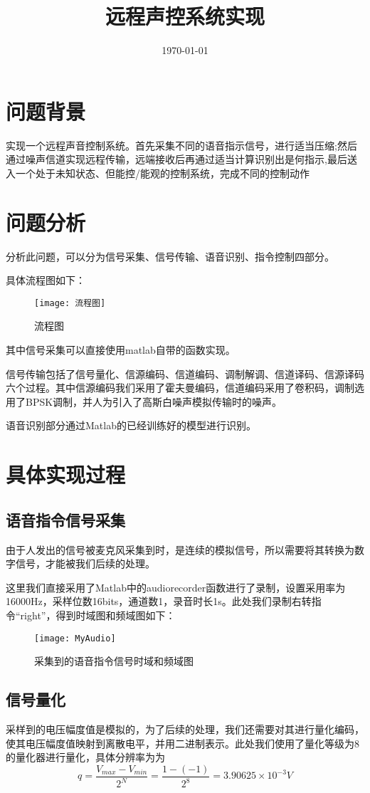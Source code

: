\documentclass{../source/Experiment}
\title{远程声控系统实现}
\date{\today}
\begin{document}
\makecover

\section{问题背景}
实现一个远程声音控制系统。首先采集不同的语音指示信号，进行适当压缩;然后通过噪声信道实现远程传输，远端接收后再通过适当计算识别出是何指示,最后送入一个处于未知状态、但能控/能观的控制系统，完成不同的控制动作

\section{问题分析}
分析此问题，可以分为信号采集、信号传输、语音识别、指令控制四部分。

具体流程图如下：
\begin{figure}[H]
    \centering
    \texttt{[image: 流程图]}
    \caption{流程图}
\end{figure}
其中信号采集可以直接使用matlab自带的函数实现。

信号传输包括了信号量化、信源编码、信道编码、调制解调、信道译码、信源译码六个过程。其中信源编码我们采用了霍夫曼编码，信道编码采用了卷积码，调制选用了BPSK调制，并人为引入了高斯白噪声模拟传输时的噪声。

语音识别部分通过Matlab的已经训练好的模型进行识别。

\section{具体实现过程}
\subsection{语音指令信号采集}
由于人发出的信号被麦克风采集到时，是连续的模拟信号，所以需要将其转换为数字信号，才能被我们后续的处理。

这里我们直接采用了Matlab中的audiorecorder函数进行了录制，设置采用率为16000Hz，采样位数16bits，通道数1，录音时长1s。此处我们录制右转指令“right”，得到时域图和频域图如下：

\begin{figure}[H]
    \centering
    \texttt{[image: MyAudio]}
    \caption{采集到的语音指令信号时域和频域图}
\end{figure}

\subsection{信号量化}
采样到的电压幅度值是模拟的，为了后续的处理，我们还需要对其进行量化编码，使其电压幅度值映射到离散电平，并用二进制表示。此处我们使用了量化等级为8的量化器进行量化，具体分辨率为为
$$
    q = \frac{V_{max} - V_{min}}{2^N} = \frac{1- (-1)}{2^8} = 3.90625\times 10^{-3}V
$$
\end{document}
